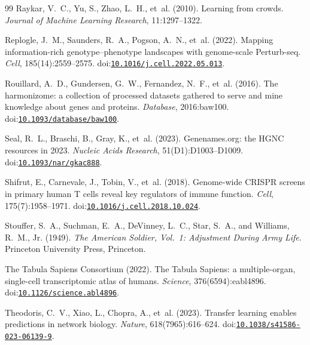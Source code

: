 \documentclass[11pt,a4paper]{article}
\begin{document}
\begin{thebibliography}{99}
Raykar, V.~C., Yu, S., Zhao, L.~H., et~al. (2010).
\newblock Learning from crowds.
\newblock \emph{Journal of Machine Learning Research}, 11:1297--1322.

Replogle, J.~M., Saunders, R.~A., Pogson, A.~N., et~al. (2022).
\newblock Mapping information-rich genotype--phenotype landscapes with genome-scale {Perturb-seq}.
\newblock \emph{Cell}, 185(14):2559--2575.
\newblock doi:\href{https://doi.org/10.1016/j.cell.2022.05.013}{\nolinkurl{10.1016/j.cell.2022.05.013}}.

Rouillard, A.~D., Gundersen, G.~W., Fernandez, N.~F., et~al. (2016).
\newblock The harmonizome: a collection of processed datasets gathered to serve and mine knowledge about genes and proteins.
\newblock \emph{Database}, 2016:baw100.
\newblock doi:\href{https://doi.org/10.1093/database/baw100}{\nolinkurl{10.1093/database/baw100}}.

Seal, R.~L., Braschi, B., Gray, K., et~al. (2023).
\newblock Genenames.org: the {HGNC} resources in 2023.
\newblock \emph{Nucleic Acids Research}, 51(D1):D1003--D1009.
\newblock doi:\href{https://doi.org/10.1093/nar/gkac888}{\nolinkurl{10.1093/nar/gkac888}}.

Shifrut, E., Carnevale, J., Tobin, V., et~al. (2018).
\newblock Genome-wide {CRISPR} screens in primary human {T} cells reveal key regulators of immune function.
\newblock \emph{Cell}, 175(7):1958--1971.
\newblock doi:\href{https://doi.org/10.1016/j.cell.2018.10.024}{\nolinkurl{10.1016/j.cell.2018.10.024}}.

Stouffer, S.~A., Suchman, E.~A., DeVinney, L.~C., Star, S.~A., and Williams, R.~M., Jr. (1949).
\newblock \emph{The American Soldier, Vol.~1: Adjustment During Army Life}.
\newblock Princeton University Press, Princeton.

{The Tabula Sapiens Consortium} (2022).
\newblock The {Tabula Sapiens}: a multiple-organ, single-cell transcriptomic atlas of humans.
\newblock \emph{Science}, 376(6594):eabl4896.
\newblock doi:\href{https://doi.org/10.1126/science.abl4896}{\nolinkurl{10.1126/science.abl4896}}.

Theodoris, C.~V., Xiao, L., Chopra, A., et~al. (2023).
\newblock Transfer learning enables predictions in network biology.
\newblock \emph{Nature}, 618(7965):616--624.
\newblock doi:\href{https://doi.org/10.1038/s41586-023-06139-9}{\nolinkurl{10.1038/s41586-023-06139-9}}.


\end{thebibliography}
\end{document}
